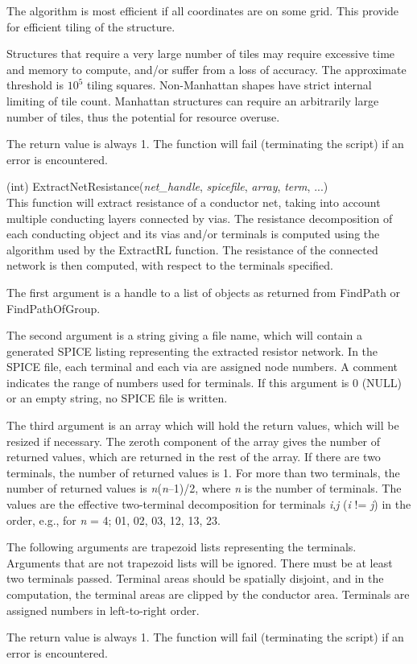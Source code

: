 \begin{description}
The algorithm is most efficient if all coordinates are on some grid. 
This provide for efficient tiling of the structure.

Structures that require a very large number of tiles may require
excessive time and memory to compute, and/or suffer from a loss of
accuracy.  The approximate threshold is $10^5$ tiling squares. 
Non-Manhattan shapes have strict internal limiting of tile count. 
Manhattan structures can require an arbitrarily large number of tiles,
thus the potential for resource overuse.

The return value is always 1.  The function will fail (terminating the
script) if an error is encountered.

\item{(int) \vt ExtractNetResistance({\it net\_handle\/},
 {\it spicefile\/}, {\it array\/}, {\it term\/}, ...)}\\
This function will extract resistance of a conductor net, taking into
account multiple conducting layers connected by vias.  The resistance
decomposition of each conducting object and its vias and/or terminals
is computed using the algorithm used by the {\vt ExtractRL} function. 
The resistance of the connected network is then computed, with respect
to the terminals specified.

The first argument is a handle to a list of objects as returned from
{\vt FindPath} or {\vt FindPathOfGroup}.

The second argument is a string giving a file name, which will contain
a generated SPICE listing representing the extracted resistor network. 
In the SPICE file, each terminal and each via are assigned node
numbers.  A comment indicates the range of numbers used for terminals. 
If this argument is 0 (NULL) or an empty string, no SPICE file is
written.

The third argument is an array which will hold the return values,
which will be resized if necessary.  The zeroth component of the array
gives the number of returned values, which are returned in the rest of
the array.  If there are two terminals, the number of returned values
is 1.  For more than two terminals, the number of returned values is
{\it n\/}{\vt *}({\it n\/}--1)/2, where {\it n} is the number of
terminals.  The values are the effective two-terminal decomposition
for terminals {\it i\/},{\it j} ({\it i} {\vt !=} {\it j\/}) in the
order, e.g., for {\it n} = 4; 01, 02, 03, 12, 13, 23.

The following arguments are trapezoid lists representing the
terminals.  Arguments that are not trapezoid lists will be ignored. 
There must be at least two terminals passed.  Terminal areas should be
spatially disjoint, and in the computation, the terminal areas are
clipped by the conductor area.  Terminals are assigned numbers in
left-to-right order.

The return value is always 1.  The function will fail (terminating the
script) if an error is encountered.

\end{description}


